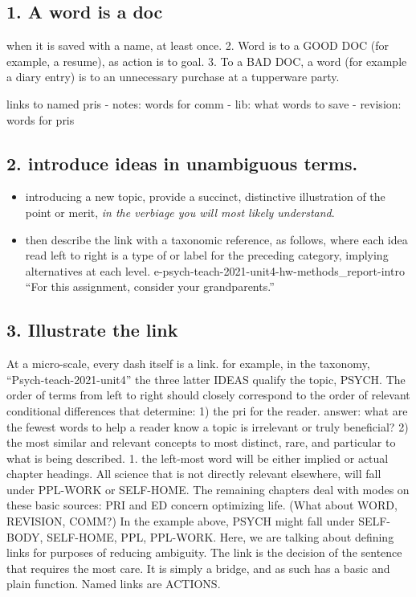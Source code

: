 \documentclass[
]{book}
\providecommand{\tightlist}{%
  \setlength{\itemsep}{0pt}\setlength{\parskip}{0pt}}
\begin{document}
\hypertarget{a-word-is-a-doc}{%
\subsection{1. A word is a doc}\label{a-word-is-a-doc}}

when it is saved
with a name, at least once.
2. Word is to a GOOD DOC (for example, a resume),
as action is to goal.
3. To a BAD DOC, a word (for example a diary entry)
is to an unnecessary purchase at a tupperware party.

links to named pris
- notes: words for comm
- lib: what words to save
- revision: words for pris

\hypertarget{introduce-ideas-in-unambiguous-terms.}{%
\subsection{2. introduce ideas in unambiguous terms.}\label{introduce-ideas-in-unambiguous-terms.}}

\begin{itemize}
\tightlist
\item
  introducing a new topic, provide a succinct, distinctive illustration of the point or merit, \emph{in the verbiage you will most likely understand}.
\item
  then describe the link with a taxonomic reference, as follows, where each idea read left to right is a type of or label for the preceding category, implying alternatives at each level.
  e-psych-teach-2021-unit4-hw-methods\_report-intro
  ``For this assignment, consider your grandparents.''
\end{itemize}

\hypertarget{illustrate-the-link}{%
\subsection{3. Illustrate the link}\label{illustrate-the-link}}

At a micro-scale, every dash itself is a link.
for example, in the taxonomy,
``Psych-teach-2021-unit4'' the three latter IDEAS qualify the topic, PSYCH. The order of terms from left to right should closely correspond to the order of relevant conditional differences that determine:
1) the pri for the reader. answer: what are the fewest words to help a reader know a topic is irrelevant or truly beneficial?
2) the most similar and relevant concepts to most distinct, rare, and particular to what is being described.
1. the left-most word will be either implied or actual chapter headings. All science that is not directly relevant elsewhere, will fall under PPL-WORK or SELF-HOME. The remaining chapters deal with modes on these basic sources: PRI and ED concern optimizing life. (What about WORD, REVISION, COMM?)
In the example above, PSYCH might fall under SELF-BODY, SELF-HOME, PPL, PPL-WORK.
Here, we are talking about defining links for purposes of reducing ambiguity.
The link is the decision of the sentence that requires the most care. It is simply a bridge, and as such has a basic and plain function.
Named links are ACTIONS.
\end{document}
